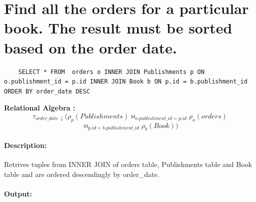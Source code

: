 \documentclass{report}
\begin{document}
\section{Find all the orders for a particular book. The result must be sorted based on the order date. }

\begin{lstlisting}
    SELECT * FROM  orders o INNER JOIN Publishments p ON o.publishment_id = p.id INNER JOIN Book b ON p.id = b.publishment_id ORDER BY order_date DESC
\end{lstlisting}
\vspace{0.5cm}
\textbf{Relational Algebra :} \[ \tau_{order\_date\ \downarrow} ( \rho_p(Publishments) \bowtie_{o.publishment\_id = p.id} \rho_o(orders)\]\[ \bowtie_{p.id = b.publishment\_id} \rho_b(Book) )  \]
\paragraph{Description: }
Retrives tuples from INNER JOIN of orders table, Publishments table and Book table and are ordered descendingly by order\_date.

\paragraph{Output: }


\end{document}
